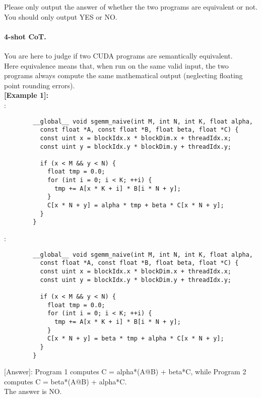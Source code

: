Please only output the answer of whether the two programs are equivalent or not. You should only output YES or NO.\\

\paragraph{4-shot CoT.} You are here to judge if two CUDA programs are semantically equivalent.\\
    Here equivalence means that, when run on the same valid input, the two programs always compute the same mathematical output (neglecting floating point rounding errors).\\

\noindent\textbf{[Example 1]:}\\
      \text{    [Program 1]}:\\
      \begin{lstlisting}
        __global__ void sgemm_naive(int M, int N, int K, float alpha,
          const float *A, const float *B, float beta, float *C) {
          const uint x = blockIdx.x * blockDim.x + threadIdx.x;
          const uint y = blockIdx.y * blockDim.y + threadIdx.y;

          if (x < M && y < N) {
            float tmp = 0.0;
            for (int i = 0; i < K; ++i) {
              tmp += A[x * K + i] * B[i * N + y];
            }
            C[x * N + y] = alpha * tmp + beta * C[x * N + y];
          }
        }
      \end{lstlisting}
      \text{    [Program 2]}:\\
      \begin{lstlisting}
        __global__ void sgemm_naive(int M, int N, int K, float alpha,
          const float *A, const float *B, float beta, float *C) {
          const uint x = blockIdx.x * blockDim.x + threadIdx.x;
          const uint y = blockIdx.y * blockDim.y + threadIdx.y;

          if (x < M && y < N) {
            float tmp = 0.0;
            for (int i = 0; i < K; ++i) {
              tmp += A[x * K + i] * B[i * N + y];
            }
            C[x * N + y] = beta * tmp + alpha * C[x * N + y];
          }
        }
      \end{lstlisting}
      [Answer]: Program 1 computes C = alpha*(A@B) + beta*C, while Program 2 computes C = beta*(A@B) + alpha*C.\\
               The answer is NO.\\
\\
